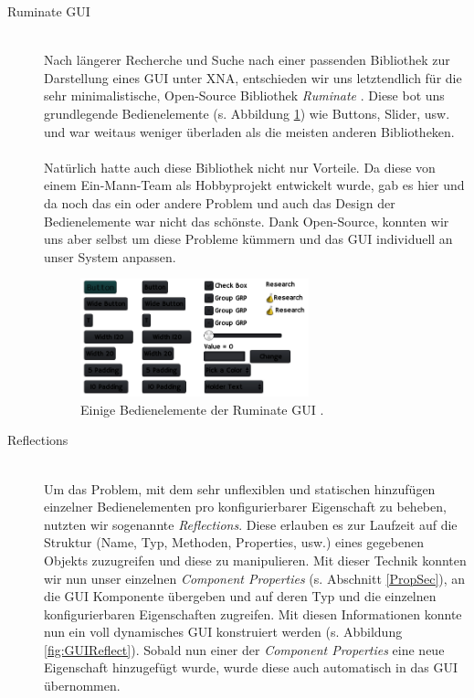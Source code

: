 \begin{Spacing}{\mylinespace}
\begin{description}
	\item[Ruminate GUI] \hfill \\
	Nach längerer Recherche und Suche nach einer passenden Bibliothek zur Darstellung eines GUI unter XNA, entschieden wir uns letztendlich für die sehr minimalistische, Open-Source Bibliothek \textit{Ruminate} \cite{Fra13}. Diese bot uns grundlegende Bedienelemente (s. Abbildung \ref{fig:Ruminate}) wie Buttons, Slider, usw. und war weitaus weniger überladen als die meisten anderen Bibliotheken.
\\\\
Natürlich hatte auch diese Bibliothek nicht nur Vorteile. Da diese von einem Ein-Mann-Team als Hobbyprojekt entwickelt wurde, gab es hier und da noch das ein oder andere Problem und auch das Design der Bedienelemente war nicht das schönste. Dank Open-Source, konnten wir uns aber selbst um diese Probleme kümmern und das GUI individuell an unser System anpassen.
	
\begin{figure}[h!]
	\centering
	\vspace*{20px}
	\includegraphics[width=250px]{graphics/ruminate.png}	
	\caption{Einige Bedienelemente der Ruminate GUI \cite{Fra13}.}
	\label{fig:Ruminate}
\end{figure}
	
	\item[Reflections] \hfill \\
	Um das Problem, mit dem sehr unflexiblen und statischen hinzufügen einzelner Bedienelementen pro konfigurierbarer Eigenschaft zu beheben, nutzten wir sogenannte \textit{Reflections}. Diese erlauben es zur Laufzeit auf die Struktur (Name, Typ, Methoden, Properties, usw.) eines gegebenen Objekts zuzugreifen und diese zu manipulieren. Mit dieser Technik konnten wir nun unser einzelnen \textit{Component Properties} (s. Abschnitt \ref{PropSec}), an die GUI Komponente übergeben und auf deren Typ und die einzelnen konfigurierbaren Eigenschaften zugreifen. Mit diesen Informationen konnte nun ein voll dynamisches GUI konstruiert werden (s. Abbildung \ref{fig:GUIReflect}). Sobald nun einer der \textit{Component Properties} eine neue Eigenschaft hinzugefügt wurde, wurde diese auch automatisch in das GUI übernommen.   
	

\end{description}
\end{Spacing}
